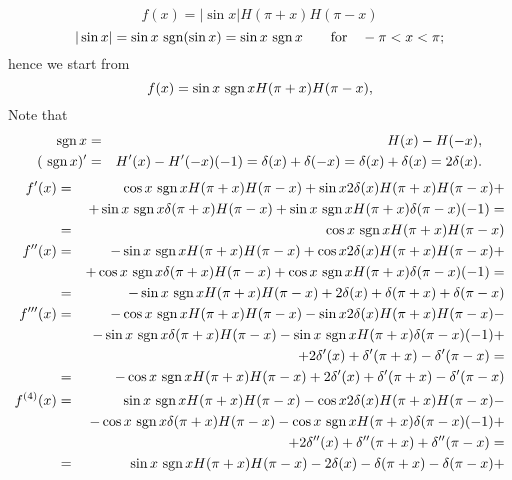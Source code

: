 {\begin{enumerate}
$$
   f(x)=|\sin x|H(\pi+x)H(\pi-x)
$$
$$
   |\sin x|=\sin x\mbox{ sgn}(\sin x)=\sin x\mbox{ sgn\,}x\qquad\mbox{for}
   \quad -\pi<x<\pi ;
$$
hence we start from
$$
  f(x)=\sin x\mbox{ sgn\,}xH(\pi+x)H(\pi-x),
$$
Note that
\begin{eqnarray*}
   \mbox{ sgn\,}x&=&H(x)-H(-x),\\
   (\mbox{ sgn\,}x)'&=&H'(x)-H'(-x)(-1)=\delta(x)+\delta(-x)=
                   \delta(x)+\delta(x)=2\delta(x).
\end{eqnarray*}
\begin{eqnarray*}
   f'(x)   &=   &\cos x\mbox{ sgn\,}xH(\pi+x)
           H(\pi-x)+\sin x2\delta(x)H(\pi+x)H(\pi-x)+\\
           &    &+\sin x\mbox{ sgn\,}x\delta(\pi+x)H(\pi-x) +
           \sin x\mbox{ sgn\,}x H(\pi+x)\delta(\pi-x)(-1)=\\
           &=   &\cos x\mbox{ sgn\,}xH(\pi+x)H(\pi-x)\\
   f''(x)   &=   & -\sin x\mbox{ sgn\,}xH(\pi+x)H(\pi-x)+
             \cos x2\delta(x)H(\pi+x)H(\pi-x)+\\
           &    &+\cos x\mbox{ sgn\,}x\delta(\pi + x)H(\pi - x)
              + \cos x\mbox{ sgn\,}x H(\pi + x)\delta(\pi - x)(-1)=\\
           &=   & -\sin x\mbox{ sgn\,}xH(\pi+x)H(\pi-x)+
             2\delta(x)+\delta(\pi+x)+\delta(\pi-x)\\
   f'''(x)   &=   & -\cos x\mbox{ sgn\,}xH(\pi+x)H(\pi-x)-
             \sin x2\delta(x)H(\pi+x)H(\pi-x)-\\
           &    &-\sin x\mbox{ sgn\,}x\delta(\pi+x)H(\pi-x) -
             \sin x \mbox{ sgn\,}x H(\pi+x)\delta(\pi-x)(-1)+\\
           &    &+2\delta'(x)+\delta'(\pi+x)-\delta'(\pi-x)=\\
           &=   & -\cos x\mbox{ sgn\,}xH(\pi+x)H(\pi-x)+
             2\delta'(x)+\delta'(\pi+x)-\delta'(\pi-x)\\
   f^{(4)}(x)   &=   & \sin x\mbox{ sgn\,}xH(\pi+x)H(\pi-x)-
             \cos x2\delta(x)H(\pi+x)H(\pi-x)-\\
           &    &-\cos x\mbox{ sgn\,}x\delta(\pi+x)H(\pi-x) -
             \cos x \mbox{ sgn\,}x H(\pi+x)\delta(\pi - x)(-1)+\\
           &    &+2\delta''(x)+\delta''(\pi+x)+\delta''(\pi-x)=\\
           &=   & \sin x\mbox{ sgn\,}xH(\pi+x)H(\pi-x)-
             2\delta(x)-\delta(\pi+x)-\delta(\pi-x)+\\

\end{eqnarray*}
\end{enumerate}}
